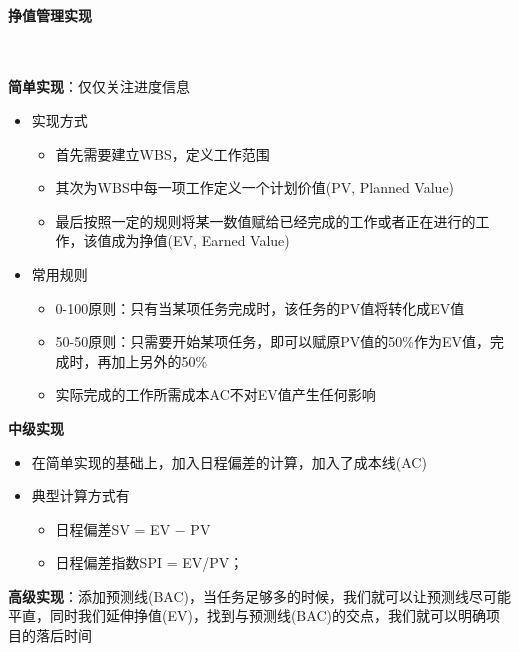 \paragraph{挣值管理实现}~{} \par
\textbf{简单实现}：仅仅关注进度信息
\begin{itemize}
    \item 实现方式
    \begin{itemize}
        \item 首先需要建立WBS，定义工作范围
        \item 其次为WBS中每一项工作定义一个计划价值(PV, Planned Value)
        \item 最后按照一定的规则将某一数值赋给已经完成的工作或者正在进行的工作，该值成为挣值(EV, Earned Value)
    \end{itemize}
    \item 常用规则
    \begin{itemize}
        \item 0-100原则：只有当某项任务完成时，该任务的PV值将转化成EV值
        \item 50-50原则：只需要开始某项任务，即可以赋原PV值的50\%作为EV值，完成时，再加上另外的50\%
        \item 实际完成的工作所需成本AC不对EV值产生任何影响
    \end{itemize}
\end{itemize}

\textbf{中级实现}
\begin{itemize}
    \item 在简单实现的基础上，加入日程偏差的计算，加入了成本线(AC)
    \item 典型计算方式有
    \vspace{-0.8em}
    \begin{multicols}{2}
        \begin{itemize}
            \item 日程偏差SV = EV $-$ PV
            \item 日程偏差指数SPI = EV/PV；
        \end{itemize}
    \end{multicols}
    \vspace{-1em}
\end{itemize}

\textbf{高级实现}：添加预测线(BAC)，当任务足够多的时候，我们就可以让预测线尽可能平直，同时我们延伸挣值(EV)，找到与预测线(BAC)的交点，我们就可以明确项目的落后时间

